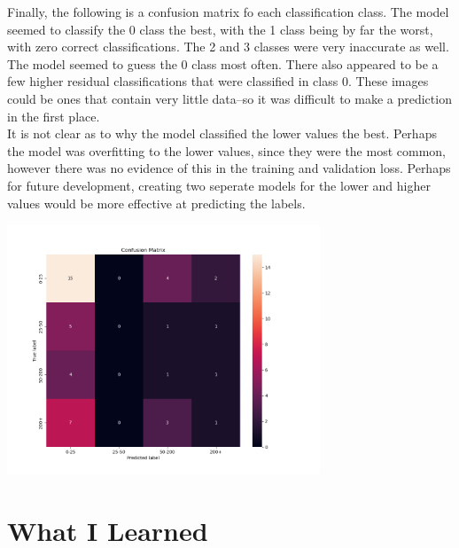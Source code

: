 \documentclass{article}[12pt]
\begin{document}
\indent
Finally, the following is a confusion matrix fo each classification class. The model seemed to classify the 0 class the best, with the 1 class being by far the worst, with zero correct classifications. The 2 and 3 classes were very inaccurate as well. The model seemed to guess the 0 class most often. There also appeared to be a few higher residual classifications that were classified in class 0. These images could be ones that contain very little data--so it was difficult to make a prediction in the first place.\\
\indent 
It is not clear as to why the model classified the lower values the best. Perhaps the model was overfitting to the lower values, since they were the most common, however there was no evidence of this in the training and validation loss. Perhaps for future development, creating two seperate models for the lower and higher values would be more effective at predicting the labels.\\

\begin{center}
    \includegraphics[width=0.7\textwidth]{images/confusion_matrix_final.png}
\end{center}


\section*{What I Learned}
\end{document}
